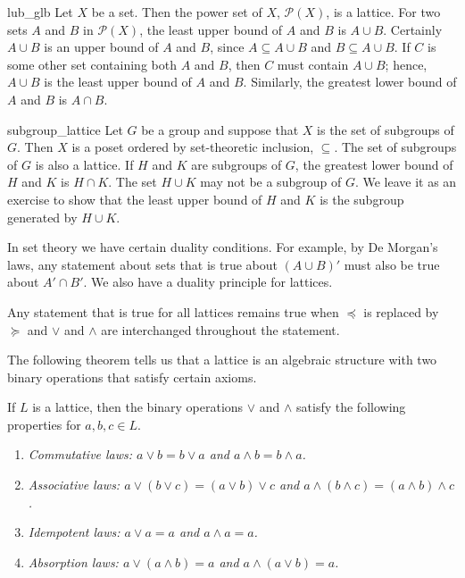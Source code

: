  

\begin{example}{lub_glb}
Let $X$ be a set. Then the power set of $X$, ${\mathcal P}(X)$, is a
lattice. For two sets $A$ and $B$ in ${\mathcal P}(X)$, the least upper
bound of $A$ and $B$ is $A \cup B$. Certainly $A \cup B$ is an upper
bound of $A$ and $B$, since $A \subseteq A \cup B$ and $B \subseteq A
\cup B$.  If $C$ is some other set containing both $A$ and $B$, then
$C$ must contain $A \cup B$; hence, $A \cup B$ is the least upper bound
of $A$ and $B$. Similarly,  the greatest lower bound of $A$ and $B$ is
$A \cap B$.
\end{example}
 
 

\begin{example}{subgroup_lattice}
Let $G$ be a group and suppose that $X$ is the set of subgroups of
$G$.  Then $X$ is a poset ordered by set-theoretic inclusion,
$\subseteq$.  The set of subgroups of $G$ is also a lattice.  If $H$
and $K$ are subgroups of $G$, the greatest lower bound of $H$ and $K$
is $H \cap K$. The set $H \cup K$ may not be a subgroup of $G$.  We
leave it as an exercise to show that the least upper bound of $H$ and
$K$ is the subgroup generated by $H \cup K$. 
\end{example}
 

 
 
In set theory we have certain duality conditions. For example, by De
Morgan's laws, any statement about sets that is true about $(A \cup
B)'$ must also be true about $A' \cap B'$. We also have a duality
principle for lattices. 
 
 
\medskip
 
 
Any statement that is true for all lattices remains true when
$\preceq$ is replaced by $\succeq$ and $\vee$ and $\wedge$ are
interchanged throughout the statement.
 
 
\medskip
 
 
The following theorem tells us that a lattice is an algebraic
structure with two binary operations that satisfy certain
axioms.						     
 
 
\begin{theorem}
If $L$ is a lattice, then the binary operations $\vee$ and $\wedge$
satisfy the following properties for $a, b, c \in L$.
\begin{enumerate}
 
\rm \item \it
Commutative laws: $a \vee b = b \vee a$ and $a \wedge b = b \wedge a$.
 
\rm \item \it
Associative laws: $a \vee ( b \vee c) = (a \vee b) \vee c$ and $a \wedge (
b \wedge c) = (a \wedge b) \wedge c$. 
 
\rm \item \it
Idempotent laws: $a \vee a = a$ and $a \wedge a = a$.
 
\rm \item \it
Absorption laws: $a \vee (a \wedge b) = a$ and $a \wedge ( a \vee b ) =a$.
 
\end{enumerate}
\end{theorem}
 
